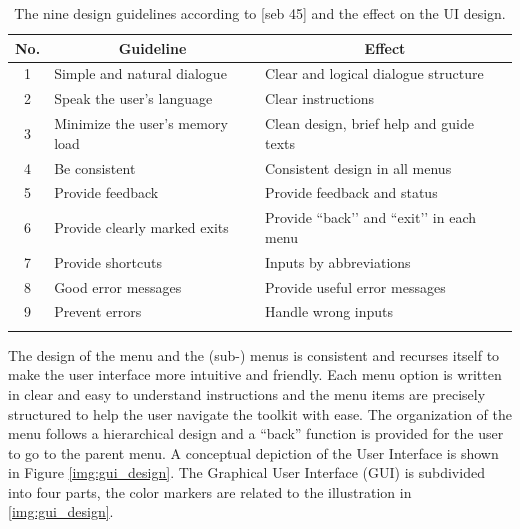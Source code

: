 \begin{table}[!ht]
\begin{center}
\begin{tabular}{cll}
\toprule
\multicolumn{1}{c}{\textbf{No.}} &\multicolumn{1}{c}{\textbf{Guideline}} & \multicolumn{1}{c}{\textbf{Effect}}\\
\midrule
\hline
1 & Simple and natural dialogue & Clear and logical dialogue structure\\

2 & Speak the user’s language & Clear instructions\\

3 & Minimize the user’s memory load & Clean design, brief help and guide texts\\

4 & Be consistent & Consistent design in all menus\\

5 & Provide feedback & Provide feedback and status\\

6 & Provide clearly marked exits & Provide ``back’’ and ``exit’’ in each menu\\

7 & Provide shortcuts & Inputs by abbreviations \\

8 & Good error messages & Provide useful error messages\\

9 & Prevent errors & Handle wrong inputs \\
\hline
\addlinespace
\bottomrule
\end{tabular}
\end{center}
\caption{The nine design guidelines according to [seb 45] and the effect on the UI design.}
\label{tab:guidline_design}
\end{table}

The design of the menu and the (sub-) menus is consistent and recurses itself to make the user interface more intuitive and friendly. Each menu option is written in clear and easy to understand instructions and the menu items are precisely structured to help the user navigate the toolkit with ease. The organization of the menu follows a hierarchical design and a ``back'' function is provided for the user to go to the parent menu. A conceptual depiction of the User Interface is shown in Figure
\ref{img:gui_design}. The Graphical User Interface (GUI) is subdivided into four parts, the color markers are related to the illustration in \ref{img:gui_design}.

